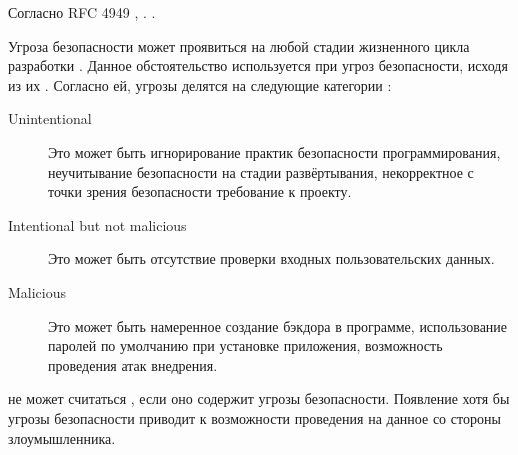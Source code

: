 %
Согласно RFC 4949 , . 
%
.
%

%
Угроза безопасности может проявиться на любой стадии жизненного цикла разработки . 
%
Данное обстоятельство используется при  угроз безопасности, исходя из их . 
%
Согласно ей, угрозы делятся на следующие категории : 
\begin{description}
	\item[Unintentional] Это может быть игнорирование практик безопасности программирования, неучитывание безопасности на стадии развёртывания, некорректное с точки зрения безопасности требование к проекту.

	\item[Intentional but not malicious] Это может быть отсутствие проверки входных пользовательских данных.

	\item[Malicious] Это может быть намеренное создание бэкдора в программе, использование паролей по умолчанию при установке приложения, возможность проведения атак внедрения.
\end{description}

%
 не может считаться , если оно содержит угрозы безопасности. 
%
Появление хотя бы угрозы безопасности приводит к возможности проведения  на данное  со стороны злоумышленника. 